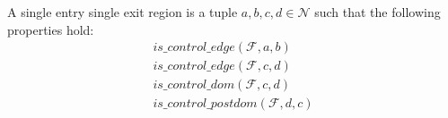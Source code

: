     \begin{definition}{}{}{}
        A single entry single exit region is a tuple $a,b,c,d\in\mathcal N$ such
        that the following properties hold:
        \begin{align*}
            is\_control\_edge(\mathcal{F},a,b)\\
            is\_control\_edge(\mathcal{F},c,d)\\
            is\_control\_dom(\mathcal{F},c,d)\\
            is\_control\_postdom(\mathcal{F},d,c)\\
        \end{align*}
    \end{definition}